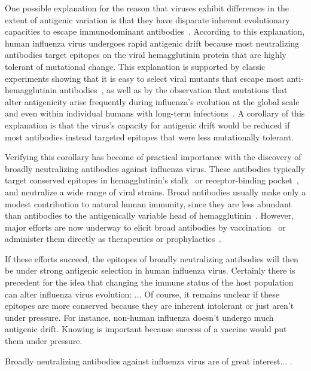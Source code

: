 \documentclass[11pt]{article}
\begin{document}
One possible explanation for the reason that viruses exhibit differences in the extent of antigenic variation is that they have disparate inherent evolutionary capacities to escape immunodominant antibodies~\citep{lipsitch2007patterns,cobey2014pathogen,fulton2015mutational}.
According to this explanation, human influenza virus undergoes rapid antigenic drift because most neutralizing antibodies target epitopes on the viral hemagglutinin protein that are highly tolerant of mutational change.
This explanation is supported by classic experiments showing that it is easy to select viral mutants that escape most anti-hemagglutinin antibodies~\citep{yewdell1979antigenic,webster1980determination}, as well as by the observation that mutations that alter antigenicity arise frequently during influenza's evolution at the global scale~\citep{koel2013substitutions,chambers2015identification,petrie2016antibodies,neher2016prediction} and even within individual humans with long-term infections~\citep{xue2017parallel}.
A corollary of this explanation is that the virus's capacity for antigenic drift would be reduced if most antibodies instead targeted epitopes that were less mutationally tolerant.

Verifying this corollary has become of practical importance with the discovery of broadly neutralizing antibodies against influenza virus.
These antibodies typically target conserved epitopes in hemagglutinin's stalk~\citep{?} or receptor-binding pocket~\citep{?}, and neutralize a wide range of viral strains.
Broad antibodies usually make only a modest contribution to natural human immunity, since they are less abundant than antibodies to the antigenically variable head of hemagglutinin~\citep{?}.
However, major efforts are now underway to elicit broad antibodies by vaccination~\citep{?} or administer them directly as therapeutics or prophylactics~\citep{?}.

If these efforts succeed, the epitopes of broadly neutralizing antibodies will then be under strong antigenic selection in human influenza virus.
Certainly there is precedent for the idea that changing the immune status of the host population can alter influenza virus evolution: ...
Of course, it remains unclear if these epitopes are more conserved because they are inherent intolerant or just aren't under pressure.
For instance, non-human influenza doesn't undergo much antigenic drift.
Knowing is important because success of a vaccine would put them under pressure.

Broadly neutralizing antibodies against influenza virus are of great interest... \cite{corti2017tackling}. 
\end{document}
